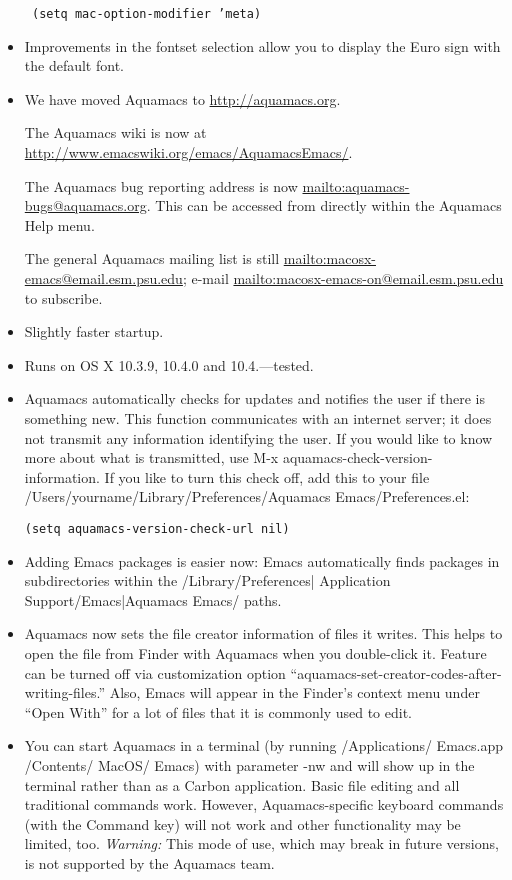 \begin{itemize}
\texttt{    (setq mac-option-modifier 'meta)}

         \item Improvements in the fontset selection allow you to display the  Euro sign
    with the default font.


\item We have moved Aquamacs to \url{http://aquamacs.org}.

 The Aquamacs wiki is now at \url{http://www.emacswiki.org/emacs/AquamacsEmacs/}.

 The Aquamacs bug reporting address is now \url{mailto:aquamacs-bugs@aquamacs.org}. This can be accessed from directly within the Aquamacs Help menu.

 The general Aquamacs mailing list is still \url{mailto:macosx-emacs@email.esm.psu.edu}; e-mail \url{mailto:macosx-emacs-on@email.esm.psu.edu} to subscribe.


\item Slightly faster startup.

\item Runs on OS X 10.3.9, 10.4.0 and 10.4.---tested.

\item Aquamacs automatically checks for updates and notifies the user
    if there is something new. This function communicates with an internet server; it does not
    transmit any information identifying the user. If you would like to
    know more about what is transmitted, use M-x
    aquamacs-check-version-information. If you like to turn this check off, add this to your file
 /Users/yourname/Library/Preferences/Aquamacs Emacs/Preferences.el:

    \texttt{(setq aquamacs-version-check-url nil)}

\item Adding Emacs packages is easier now: Emacs automatically finds
    packages in subdirectories within the /Library/{Preferences| Application
    Support}/{Emacs|Aquamacs Emacs}/ paths.

\item Aquamacs now sets the file creator information of files it
    writes. This helps to open the file from Finder with Aquamacs when
    you double-click it. Feature can be turned off via customization
    option ``aquamacs-set-creator-codes-after-writing-files.''  Also,
    Emacs will appear in the Finder's context menu under ``Open With''
    for a lot of files that it is commonly used to edit.

\item You can start Aquamacs in a terminal (by running
    /Applications/ Emacs.app /Contents/ MacOS/ Emacs) with parameter -nw
    and will show up in the terminal rather than as a  Carbon
    application. Basic file editing and all traditional commands
    work. However, Aquamacs-specific keyboard commands (with the
    Command key) will not work and other functionality may be limited,
    too. \textit{Warning: }This mode of use, which may break in future versions, is not
    supported by the Aquamacs team.



\end{itemize}
